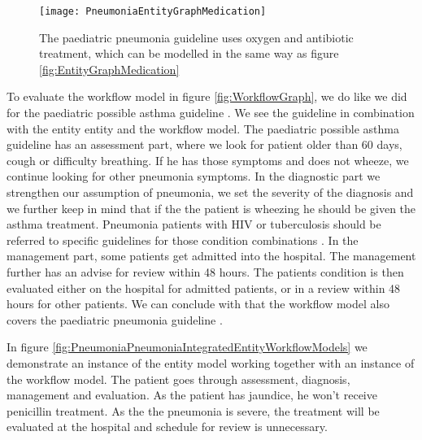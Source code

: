 \begin{figure}[h!]
	\texttt{[image: PneumoniaEntityGraphMedication]}
	\caption {The paediatric pneumonia guideline \parencite{RepublicofKeny2016} uses oxygen and antibiotic treatment, which can be modelled in the same way as figure \ref{fig:EntityGraphMedication}}
	\label{fig:PneumoniaEntityMedication}
\end{figure}






To evaluate the workflow model in figure \ref{fig:WorkflowGraph}, we do like we did for the paediatric possible asthma guideline \parencite{RepublicofKeny2016}. We see the guideline in combination with the entity entity and the workflow model. The paediatric possible asthma guideline \parencite{RepublicofKeny2016} has an assessment part, where we look for patient older than 60 days, cough or difficulty breathing. If he has those symptoms and does not wheeze, we continue looking for other pneumonia symptoms. In the diagnostic part we strengthen our assumption of pneumonia, we set the severity of the diagnosis and we further keep in mind that if the the patient is wheezing he should be given the asthma treatment. Pneumonia patients with HIV or tuberculosis should be referred to specific guidelines for those condition combinations \parencite{RepublicofKeny2016}. In the management part, some patients get admitted into the hospital. The management further has an advise for review within 48 hours. The patients condition is then evaluated either on the hospital for admitted patients, or in a review within 48 hours for other patients. We can conclude with that the workflow model  also covers the paediatric pneumonia guideline \parencite{RepublicofKeny2016}.

In figure \ref{fig:PneumoniaPneumoniaIntegratedEntityWorkflowModels} we demonstrate an instance of the entity model working together with an instance of the workflow model. The patient goes through assessment, diagnosis, management and evaluation. As the patient has jaundice, he won't receive penicillin treatment. As the the pneumonia is severe, the treatment will be evaluated at the hospital and schedule for review is unnecessary. 

